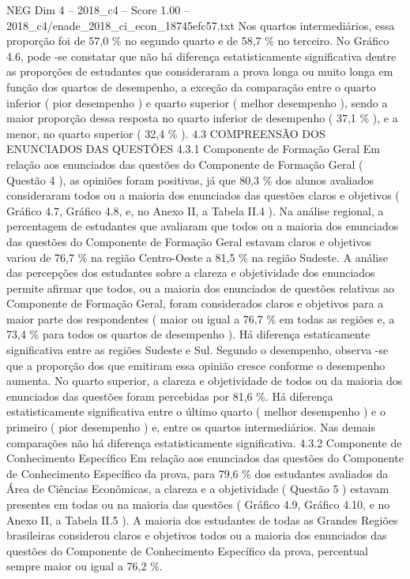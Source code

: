 \begin{textsample}{NEG Dim 4 – 2018\_c4 – Score 1.00 – 2018\_c4/enade\_2018\_ci\_econ\_18745efc57.txt}
Nos quartos intermediários, essa proporção foi de 57,0 \% no segundo quarto e de 58,7 \% no terceiro.
No Gráfico 4.6, pode -se constatar que não há diferença estatisticamente significativa dentre as proporções de estudantes que consideraram a prova longa ou muito longa em função dos quartos de desempenho, a exceção da comparação entre o quarto inferior ( pior desempenho ) e quarto superior ( melhor desempenho ), sendo a maior proporção dessa resposta no quarto inferior de desempenho ( 37,1 \% ), e a menor, no quarto superior ( 32,4 \% ). 4.3 COMPREENSÃO DOS ENUNCIADOS DAS QUESTÕES 4.3.1 Componente de Formação Geral Em relação aos enunciados das questões do Componente de Formação Geral ( Questão 4 ), as opiniões foram positivas, já que 80,3 \% dos alunos avaliados consideraram todos ou a maioria dos enunciados das questões claros e objetivos ( Gráfico 4.7, Gráfico 4.8, e, no Anexo II, a Tabela II.4 ).
Na análise regional, a percentagem de estudantes que avaliaram que todos ou a maioria dos enunciados das questões do Componente de Formação Geral estavam claros e objetivos variou de 76,7 \% na região Centro-Oeste a 81,5 \% na região Sudeste.
A análise das percepções dos estudantes sobre a clareza e objetividade dos enunciados permite afirmar que todos, ou a maioria dos enunciados de questões relativas ao Componente de Formação Geral, foram considerados claros e objetivos para a maior parte dos respondentes ( maior ou igual a 76,7 \% em todas as regiões e, a 73,4 \% para todos os quartos de desempenho ).
Há diferença estaticamente significativa entre as regiões Sudeste e Sul.
Segundo o desempenho, observa -se que a proporção dos que emitiram essa opinião cresce conforme o desempenho aumenta.
No quarto superior, a clareza e objetividade de todos ou da maioria dos enunciados das questões foram percebidas por 81,6 \%.
Há diferença estatisticamente significativa entre o último quarto ( melhor desempenho ) e o primeiro ( pior desempenho ) e, entre os quartos intermediários.
Nas demais comparações não há diferença estatisticamente significativa. 4.3.2 Componente de Conhecimento Específico Em relação aos enunciados das questões do Componente de Conhecimento Específico da prova, para 79,6 \% dos estudantes avaliados da Área de Ciências Econômicas, a clareza e a objetividade ( Questão 5 ) estavam presentes em todas ou na maioria das questões ( Gráfico 4.9, Gráfico 4.10, e no Anexo II, a Tabela II.5 ).
A maioria dos estudantes de todas as Grandes Regiões brasileiras considerou claros e objetivos todos ou a maioria dos enunciados das questões do Componente de Conhecimento Específico da prova, percentual sempre maior ou igual a 76,2 \%.

\end{textsample}
